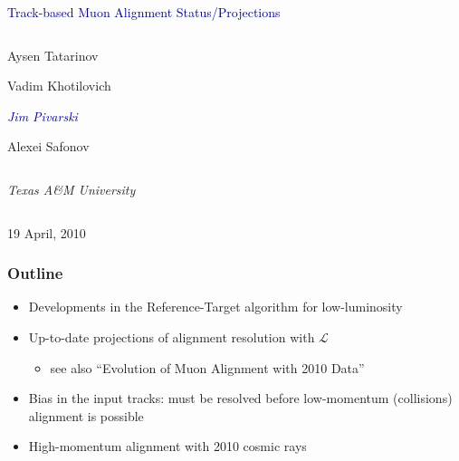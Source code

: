 \documentclass[compress]{beamer}
\begin{document}
\begin{frame}
\vfill
\begin{center}
\textcolor{darkblue}{\Large Track-based Muon Alignment Status/Projections}

\vfill
\begin{columns}
\begin{center}
\large
Aysen Tatarinov

Vadim Khotilovich

\textcolor{darkblue}{\it Jim Pivarski}

Alexei Safonov
\end{center}
\end{columns}

\begin{columns}
\begin{center}
\scriptsize
{\it Texas A\&M University}
\end{center}
\end{columns}

\vfill
19 April, 2010

\end{center}
\end{frame}


\small

\begin{frame}
\frametitle{Outline}
\begin{itemize}\setlength{\itemsep}{0.5 cm}
\item Developments in the Reference-Target algorithm for low-luminosity
\item Up-to-date projections of alignment resolution with $\mathcal{L}$
\begin{itemize}
\item see also ``Evolution of Muon Alignment with 2010 Data''
\end{itemize}

\item Bias in the input tracks: must be resolved before
  low-momentum (collisions) alignment is possible
\item High-momentum alignment with 2010 cosmic rays
\end{itemize}
\end{frame}
\end{document}
